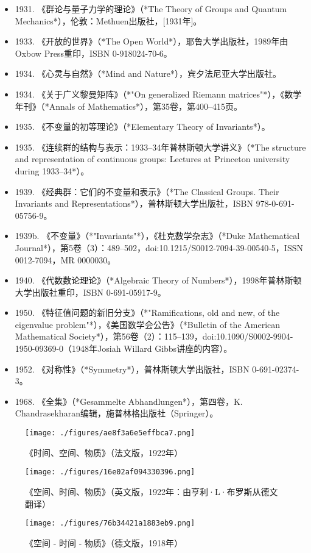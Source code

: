 \begin{itemize}
\item 1931. 《群论与量子力学的理论》（*The Theory of Groups and Quantum Mechanics*），伦敦：Methuen出版社，[1931年]。  
\item 1933. 《开放的世界》（*The Open World*），耶鲁大学出版社，1989年由Oxbow Press重印，ISBN 0-918024-70-6。  
\item 1934. 《心灵与自然》（*Mind and Nature*），宾夕法尼亚大学出版社。  
\item 1934. 《关于广义黎曼矩阵》（*"On generalized Riemann matrices"*），《数学年刊》（*Annals of Mathematics*），第35卷，第400–415页。  
\item 1935. 《不变量的初等理论》（*Elementary Theory of Invariants*）。  
\item 1935. 《连续群的结构与表示：1933–34年普林斯顿大学讲义》（*The structure and representation of continuous groups: Lectures at Princeton university during 1933–34*）。  
\item 1939. 《经典群：它们的不变量和表示》（*The Classical Groups. Their Invariants and Representations*），普林斯顿大学出版社，ISBN 978-0-691-05756-9。  
\item 1939b. 《不变量》（*"Invariants"*），《杜克数学杂志》（*Duke Mathematical Journal*），第5卷（3）：489–502，doi:10.1215/S0012-7094-39-00540-5，ISSN 0012-7094，MR 0000030。  
\item 1940. 《代数数论理论》（*Algebraic Theory of Numbers*），1998年普林斯顿大学出版社重印，ISBN 0-691-05917-9。  
\item 1950. 《特征值问题的新旧分支》（*"Ramifications, old and new, of the eigenvalue problem"*），《美国数学会公告》（*Bulletin of the American Mathematical Society*），第56卷（2）：115–139，doi:10.1090/S0002-9904-1950-09369-0（1948年Josiah Willard Gibbs讲座的内容）。  
\item 1952. 《对称性》（*Symmetry*），普林斯顿大学出版社，ISBN 0-691-02374-3。  
\item 1968. 《全集》（*Gesammelte Abhandlungen*），第四卷，K. Chandrasekharan编辑，施普林格出版社（Springer）。  
\end{itemize}
\begin{figure}[ht]
\centering
\texttt{[image: ./figures/ae8f3a6e5effbca7.png]}
\caption{《时间、空间、物质》（法文版，1922年）} \label{fig_WR_4}
\end{figure}
\begin{figure}[ht]
\centering
\texttt{[image: ./figures/16e02af094330396.png]}
\caption{《空间、时间、物质》（英文版，1922年：由亨利·L·布罗斯从德文翻译）} \label{fig_WR_5}
\end{figure}
\begin{figure}[ht]
\centering
\texttt{[image: ./figures/76b34421a1883eb9.png]}
\caption{《空间 - 时间 - 物质》（德文版，1918年）} \label{fig_WR_6}
\end{figure}
